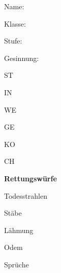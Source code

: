 \documentclass{article}
\begin{document}
\begin{minipage}{.5\textwidth}

Name: \hrulefill

Klasse: \hrulefill

\end{minipage}
\begin{minipage}{.5\textwidth}

Stufe: \hrulefill

Gesinnung: \hrulefill

\end{minipage}

\vspace{2cm}

\begin{minipage}{.5\textwidth}

ST \hrulefill
 
IN \hrulefill

WE \hrulefill

GE \hrulefill

KO \hrulefill

CH \hrulefill

\end{minipage}
\begin{minipage}{.5\textwidth}

\textbf{Rettungswürfe}

Todesstrahlen \hrulefill

Stäbe \hrulefill

Lähmung \hrulefill

Odem \hrulefill

Sprüche \hrulefill

\end{minipage}
\end{document}
